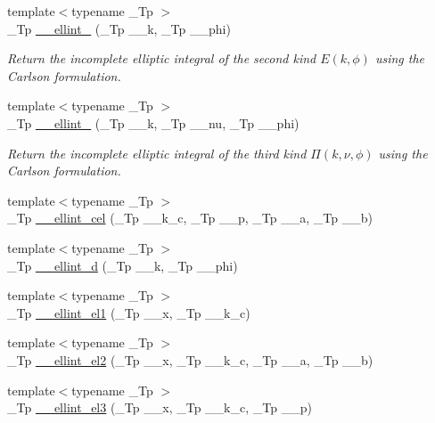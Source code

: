 \begin{DoxyCompactItemize}
{\footnotesize template$<$typename \+\_\+\+Tp $>$ }\\\+\_\+\+Tp \hyperlink{namespacestd_1_1____detail_ad3687a38e74e5fbf08265501add0b56a}{\+\_\+\+\_\+ellint\+\_} (\+\_\+\+Tp \+\_\+\+\_\+k, \+\_\+\+Tp \+\_\+\+\_\+phi)
\begin{DoxyCompactList}\small\item\em Return the incomplete elliptic integral of the second kind $ E(k,\phi) $ using the Carlson formulation. \end{DoxyCompactList}\item 
{\footnotesize template$<$typename \+\_\+\+Tp $>$ }\\\+\_\+\+Tp \hyperlink{namespacestd_1_1____detail_a9c6ea96cd5d6907fce278010b992499a}{\+\_\+\+\_\+ellint\+\_} (\+\_\+\+Tp \+\_\+\+\_\+k, \+\_\+\+Tp \+\_\+\+\_\+nu, \+\_\+\+Tp \+\_\+\+\_\+phi)
\begin{DoxyCompactList}\small\item\em Return the incomplete elliptic integral of the third kind $ \Pi(k,\nu,\phi) $ using the Carlson formulation. \end{DoxyCompactList}\item 
{\footnotesize template$<$typename \+\_\+\+Tp $>$ }\\\+\_\+\+Tp \hyperlink{namespacestd_1_1____detail_a7c7d04715f0d40e054299312db35e32d}{\+\_\+\+\_\+ellint\+\_\+cel} (\+\_\+\+Tp \+\_\+\+\_\+k\+\_\+c, \+\_\+\+Tp \+\_\+\+\_\+p, \+\_\+\+Tp \+\_\+\+\_\+a, \+\_\+\+Tp \+\_\+\+\_\+b)
\item 
{\footnotesize template$<$typename \+\_\+\+Tp $>$ }\\\+\_\+\+Tp \hyperlink{namespacestd_1_1____detail_a00da42d89830fd51e9934fe0c5e08b7f}{\+\_\+\+\_\+ellint\+\_\+d} (\+\_\+\+Tp \+\_\+\+\_\+k, \+\_\+\+Tp \+\_\+\+\_\+phi)
\item 
{\footnotesize template$<$typename \+\_\+\+Tp $>$ }\\\+\_\+\+Tp \hyperlink{namespacestd_1_1____detail_aa17b1b382a89552f49fbb8c5eda1d50f}{\+\_\+\+\_\+ellint\+\_\+el1} (\+\_\+\+Tp \+\_\+\+\_\+x, \+\_\+\+Tp \+\_\+\+\_\+k\+\_\+c)
\item 
{\footnotesize template$<$typename \+\_\+\+Tp $>$ }\\\+\_\+\+Tp \hyperlink{namespacestd_1_1____detail_a82449d0f05d40ba2cef6b8fc57dd5bae}{\+\_\+\+\_\+ellint\+\_\+el2} (\+\_\+\+Tp \+\_\+\+\_\+x, \+\_\+\+Tp \+\_\+\+\_\+k\+\_\+c, \+\_\+\+Tp \+\_\+\+\_\+a, \+\_\+\+Tp \+\_\+\+\_\+b)
\item 
{\footnotesize template$<$typename \+\_\+\+Tp $>$ }\\\+\_\+\+Tp \hyperlink{namespacestd_1_1____detail_a2a2b5b80edd39b3d1f852f10c5f277fc}{\+\_\+\+\_\+ellint\+\_\+el3} (\+\_\+\+Tp \+\_\+\+\_\+x, \+\_\+\+Tp \+\_\+\+\_\+k\+\_\+c, \+\_\+\+Tp \+\_\+\+\_\+p)

\end{DoxyCompactItemize}
